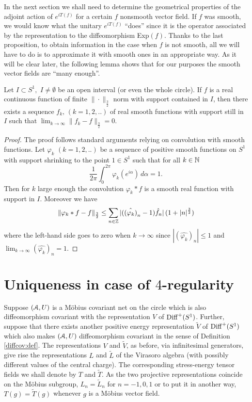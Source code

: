 \documentclass[12pt]{article}
\begin{document}
In the next section we shall need to determine the geometrical
properties of the adjoint action of $e^{iT(f)}$ for a certain $f$
nonsmooth vector field. If $f$ was smooth, we would know what 
the unitary $e^{iT(f)}$ ``does'' since it is the operator
associated by the representation to the diffeomorphism Exp$(f)$.
Thanks to the last proposition, to obtain information in the
case when $f$ is not smooth, all we will have to do is
to approximate it with smooth ones in an appropriate way.
As it will be clear later, the following lemma shows that 
for our purposes the smooth vector fields are ``many enough''.
\begin{lemma}
\label{density}
Let $I \subset S^1, \,\, I\neq\emptyset$ be an open 
interval (or even the whole circle). If
$f$ is a real continuous function of finite 
$\|\cdot\|_{\frac{3}{2}}$ norm with support 
contained in $I$, then there exists a sequence
$f_k,\,(k=1,2,..)$ of real smooth functions with 
support still in $I$ such that 
$\lim_{k\to \infty}\|f_k-f\|_{\frac{3}{2}}=0$.
\end{lemma}
\begin{proof}
The proof follows standard arguments relying on 
convolution with smooth functions. 
Let $\varphi_k \,\, (k=1,2,..)$ be a sequence
of positive smooth functions on $S^1$ with support
shrinking to the point $1 \in S^1$ such that for
all $k \in {\mathbb N}$ 
$$\frac{1}{2\pi}\int_0^{2\pi} \varphi_k(e^{i\alpha})
\,d\alpha=1.$$
Then for $k$ large enough the convolution $\varphi_k*f$
is a smooth real function with support in $I$. Moreover we have 
$$\|\varphi_k*f-f\|_{\frac{3}{2}} \leq \sum_{n\in
{\mathbb Z}}|(\hat{(\varphi_k)}_n-1) \hat{f}_n|\,(1+|n|^{\frac{3}{2}})$$  
where the left-hand side goes to zero when $k \to \infty$ since
$|(\hat{\varphi_k})_n| \leq 1$ and 
$\lim_{k\to\infty}(\hat{\varphi_k})_n=1$.
\end{proof}
\section{Uniqueness in case of $4$-regularity}
\label{sectuniq4reg}
Suppose $({\mathcal A},U)$ is a M\"obius covariant net on the circle which is also
diffeomorphism covariant with the representation $V$ of ${{\rm Diff}^+(S^1)}$.
Further, suppose that there exists another positive energy 
representation $\tilde{V}$ of ${{\rm Diff}^+(S^1)}$  which 
also makes $({\mathcal A},U)$ diffeomorphism covariant in the sense 
of Definition \ref{diffcov:def}.
The representations $V$ and $\tilde{V}$, as before, via infinitesimal
generators, give rise the representations $L$ and $\tilde{L}$ of the
Virasoro algebra (with possibly different values of the central charge).
The corresponding stress-energy tensor fields we shall denote by $T$ and
$\tilde{T}$. As the two projective representations coincide on the
M\"obius subgroup, $L_n=\tilde{L}_n$ for $n=-1,0,1$ or to put it in
another way, $T(g)=\tilde{T}(g)$ whenever $g$ is a M\"obius vector field.
\end{document}
